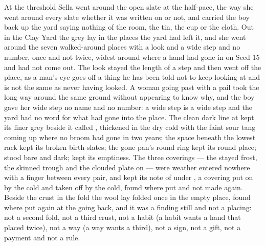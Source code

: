 At the threshold Sella went around the open slate at the half-pace, the way she went around every slate whether it was written on or not, and carried the boy back up the yard saying nothing of the room, the tin, the cup or the cloth. Out in the Clay Yard the grey lay in the places the yard had left it, and she went around the seven walked-around places with a look and a wide step and no number, once and not twice, widest around  where a hand had gone in on Seed 15 and had not come out. The look stayed the length of a step and then went off the place, as a man's eye goes off a thing he has been told not to keep looking at and is not the same as never having looked. A woman going past with a pail took the long way around the same ground without appearing to know why, and the boy gave her wide step no name and no number: a wide step is a wide step and the yard had no word for what had gone into the place. The clean dark line at  kept its finer grey beside it called , thickened in the dry cold with the faint sour tang coming up where no broom had gone in two years; the space beneath the lowest rack kept its broken birth-slates; the gone pan's round ring kept its round place;  stood bare and dark;  kept its emptiness. The three coverings --- the stayed frost, the skinned trough and the clouded plate on  --- were weather entered nowhere with a finger between every pair, and  kept its note of  under , a covering put on by the cold and taken off by the cold, found where put and not made again. Beside the crust in the fold the wool lay folded once in the empty place, found where put again at the going back, and it was a finding still and not a placing: not a second fold, not a third crust, not a habit (a habit wants a hand that placed twice), not a way (a way wants a third), not a sign, not a gift, not a payment and not a rule.

